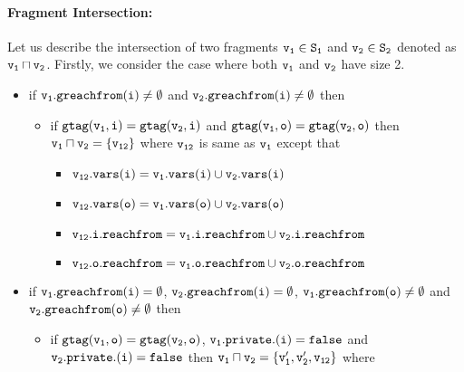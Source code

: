 \paragraph{Fragment Intersection:} Let us describe the intersection of two fragments $\tt v_1 \in S_1$ and $\tt v_2 \in S_2$ denoted as $\tt v_1 \sqcap v_2$. Firstly, we consider the case where both $\tt v_1$ and $\tt v_2$ have size 2.
 \begin{itemize}
 \item if $\tt v_1.greachfrom(i) \neq \emptyset$ and $\tt v_2.greachfrom(i) \neq \emptyset$ then 
  \begin{itemize}
  \item if $\tt gtag(v_1, i) = gtag(v_2, i)$ and $\tt gtag(v_1, o) = gtag(v_2, o)$ then $\tt v_1 \sqcap v_2 = \{v_{12}\}$ where $\tt v_{12}$ is same as $\tt v_1$ except that 
  \begin{itemize}
  \item $\tt v_{12}.vars(i) = v_1.vars(i) \cup v_2.vars(i)$ 
  \item  $\tt v_{12}.vars(o) = v_1.vars(o) \cup v_2.vars(o)$
  \item $\tt v_{12}.i.reachfrom = v_{1}.i.reachfrom \cup v_{2}.i.reachfrom$
   \item $\tt v_{12}.o.reachfrom = v_{1}.o.reachfrom \cup v_{2}.o.reachfrom$
    \end{itemize}
 \end{itemize}

 \item if $\tt v_1.greachfrom(i) = \emptyset$, $\tt v_2.greachfrom(i) = \emptyset$, $\tt v_1.greachfrom(o) \neq \emptyset$ and $\tt v_2.greachfrom(o) \neq \emptyset$ then 
  \begin{itemize}
  \item if $\tt gtag(v_1, o) = gtag(v_2, o)$, $\tt v_1.private.(i) = false$ and $\tt v_2.private.(i) = false$ then $\tt v_1 \sqcap v_2 = \{v_1', v_2', v_{12}\}$ where %
    

\end{itemize}
\end{itemize}
